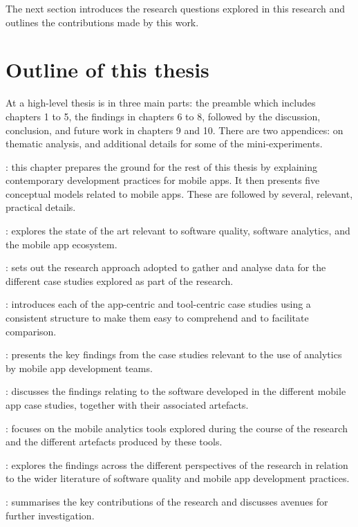 The next section introduces the research questions explored in this research and outlines the contributions made by this work.




\section{Outline of this thesis}
At a high-level thesis is in three main parts: the preamble which includes chapters 1 to 5, the findings in chapters 6 to 8, followed by the discussion, conclusion, and future work in chapters 9 and 10. There are two appendices: on thematic analysis, and additional details for some of the mini-experiments.


: this chapter prepares the ground for the rest of this thesis by explaining contemporary development practices for mobile apps. It then presents five conceptual models related to mobile apps. These are followed by several, relevant, practical details.

: explores the state of the art relevant to software quality, software analytics, and the mobile app ecosystem.

: sets out the research approach adopted to gather and analyse data for the different case studies explored as part of the research.

: introduces each of the app-centric and tool-centric case studies using a consistent structure to make them easy to comprehend and to facilitate comparison.

: presents the key findings from the case studies relevant to the use of analytics by mobile app development teams.

: discusses the findings relating to the software developed in the different mobile app case studies, together with their associated artefacts.

: focuses on the mobile analytics tools explored during the course of the research and the different artefacts produced by these tools.

: explores the findings across the different perspectives of the research in relation to the wider literature of software quality and mobile app development practices.

: summarises the key contributions of the research and discusses avenues for further investigation.
